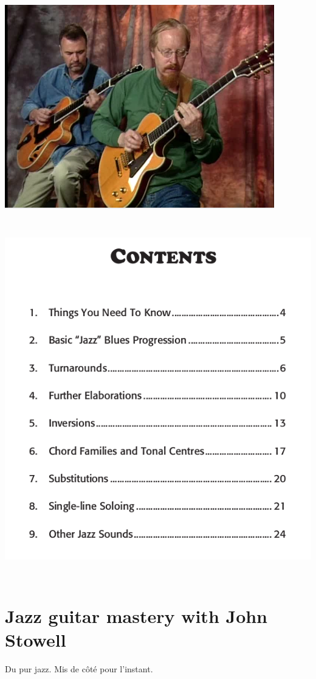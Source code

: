 \documentclass[a4paper]{book}
\begin{document}
\begin{center}
\includegraphics[width=11.716cm,height=8.869cm]{lebluessupportsmethodes-img109.png}
\end{center}



\begin{center}
\includegraphics[width=14.76cm,height=15.503cm]{lebluessupportsmethodes-img110.png}
\end{center}
\clearpage\section[Jazz guitar mastery with John Stowell]{Jazz guitar
mastery with John Stowell}
\hypertarget{RefHeadingToc166973218262}{}Du pur jazz. Mis de c\^ot\'e
pour l{\textquoteright}instant.
\end{document}
